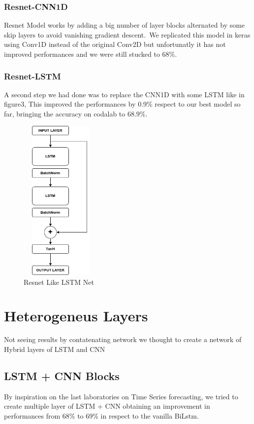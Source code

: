 \documentclass[11pt]{article}
\begin{document}
\subsubsection{Resnet-CNN1D}
Resnet Model works by adding a big number of layer blocks alternated by some skip layers to avoid vanishing gradient descent.\
We replicated this model in keras using Conv1D instead of the original Conv2D but unfortunatly it has not improved performances and we were still stucked to 68\%.
\subsubsection{Resnet-LSTM}
A second step we had done was to replace the CNN1D with some LSTM like in figure3,
This improved the performances by 0.9\% respect to our best model so far, bringing the accuracy on codalab to 68.9\%.
\begin{figure}[h]
\centering
\includegraphics[width=4cm, height=8cm,angle =90]{resnet}
\caption{Resnet Like LSTM Net}
\end{figure}

\section{Heterogeneus Layers}
Not seeing results by contatenating network we thought to create a network of Hybrid layers of LSTM and CNN
\subsection{LSTM + CNN Blocks}
By inspiration on the last laboratories on Time Series forecasting, we tried to create multiple layer of LSTM + CNN
obtaining an improvement in performances from 68\% to 69\% in respect to the vanilla BiLstm.
\end{document}
